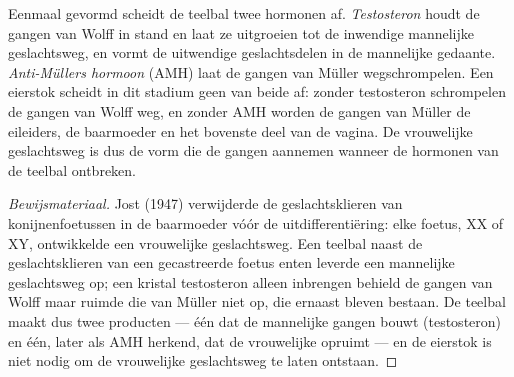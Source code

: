 \begin{proposition}\label{prop:g11:becoming-male-female:hormones}
Eenmaal gevormd scheidt de teelbal twee hormonen af.
\emph{Testosteron} houdt de gangen van Wolff in stand
en laat ze uitgroeien tot de inwendige mannelijke geslachtsweg, en vormt
de uitwendige geslachtsdelen in de mannelijke gedaante. \emph{Anti-Müllers
hormoon} (AMH) laat de gangen van Müller wegschrompelen. Een eierstok
scheidt in dit stadium geen van beide af: zonder testosteron schrompelen
de gangen van Wolff weg, en zonder AMH worden de gangen van Müller de
eileiders, de baarmoeder en het bovenste deel van de vagina. De
vrouwelijke geslachtsweg is dus de vorm die de gangen aannemen wanneer de
hormonen van de teelbal ontbreken.
\end{proposition}
\begin{proof}[Bewijsmateriaal]
Jost (1947) verwijderde de geslachtsklieren van konijnenfoetussen in de
baarmoeder vóór de uitdifferentiëring: elke foetus, XX of XY, ontwikkelde
een vrouwelijke geslachtsweg. Een teelbal naast de geslachtsklieren van
een gecastreerde foetus enten leverde een mannelijke geslachtsweg op; een
kristal testosteron alleen inbrengen behield de gangen van Wolff maar
ruimde die van Müller niet op, die ernaast bleven bestaan. De teelbal
maakt dus twee producten --- één dat de mannelijke gangen bouwt
(testosteron) en één, later als AMH herkend, dat de vrouwelijke opruimt
--- en de eierstok is niet nodig om de vrouwelijke geslachtsweg te laten
ontstaan.
\end{proof}

